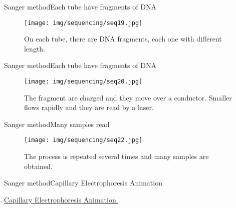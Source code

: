 \documentclass[10pt]{beamer}
\newcommand{\1}{
	\setbeamertemplate{background}{
		\texttt{[image: img/1]}
		\tikz[overlay] \fill[fill opacity=0.75,fill=white] (0,0) rectangle (-\paperwidth,\paperheight);
	}
}
\begin{document}
\begin{frame}{Sanger method}{Each tube have fragments of DNA}
	\begin{figure}[]
		\centering
		\texttt{[image: img/sequencing/seq19.jpg]}
		\label{img:mot2}
		\caption{On each tube, there are DNA fragments, each one with different length.}
	\end{figure}
\end{frame}

\begin{frame}{Sanger method}{Each tube have fragments of DNA}
	\begin{figure}[]
		\centering
		\texttt{[image: img/sequencing/seq20.jpg]}
		\label{img:mot2}
		\caption{The fragment are charged and they move over a conductor. Smaller flows rapidly and they are read by a laser.}
	\end{figure}
\end{frame}

\begin{frame}{Sanger method}{Many samples read}
	\begin{figure}[]
		\centering
		\texttt{[image: img/sequencing/seq22.jpg]}
		\label{img:mot2}
		\caption{The process is repeated several times and many samples are obtained.}
	\end{figure}
\end{frame}


\begin{frame}{Sanger method}{Capillary Electrophoresis Animation}
	\begin{block}{}
		\href{https://www.youtube.com/watch?v=wdS3j0TgbjM&list=PLgM5s3vRHCgejiz7lKLR318mXs0ox4NFC&index=6&t=0s}{Capillary Electrophoresis Animation.}
		
	\end{block}
\end{frame}
\end{document}

